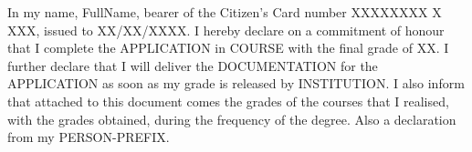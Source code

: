 In my name, FullName, bearer of the Citizen's Card number XXXXXXXX X XXX, issued to XX/XX/XXXX. I hereby declare on a commitment of honour that I complete the APPLICATION in COURSE with the final grade of XX. I further declare that I will deliver the DOCUMENTATION for the APPLICATION as soon as my grade is released by INSTITUTION. I also inform that attached to this document comes the grades of the courses that I realised, with the grades obtained, during the frequency of the degree. Also a declaration from my PERSON-PREFIX.